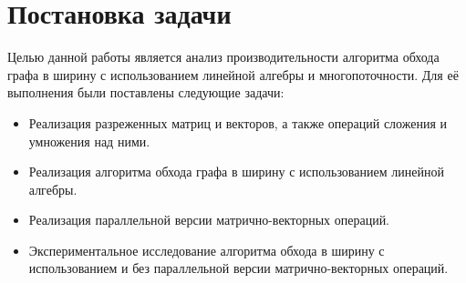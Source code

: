 
\section{Постановка задачи}

Целью данной работы является анализ производительности алгоритма обхода графа в ширину с использованием линейной алгебры и многопоточности. Для её выполнения были поставлены следующие задачи:

\begin{itemize}
    \item Реализация разреженных матриц и векторов, а также операций сложения и умножения над ними.
    \item Реализация алгоритма обхода графа в ширину с использованием линейной алгебры.
    \item Реализация параллельной версии матрично-векторных операций.
    \item Экспериментальное исследование алгоритма обхода в ширину с использованием и без параллельной версии матрично-векторных операций.
\end{itemize}